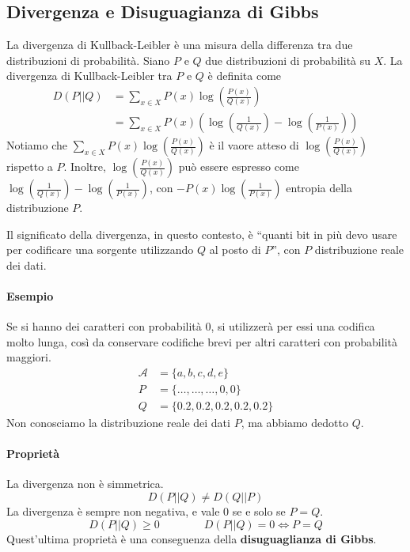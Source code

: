 \subsection{Divergenza e Disuguagianza di Gibbs}
La divergenza di Kullback-Leibler è una misura della differenza tra due distribuzioni di probabilità. Siano $P$ e $Q$ due distribuzioni di probabilità su $X$. La divergenza di Kullback-Leibler tra $P$ e $Q$ è definita come
\begin{align*}
    D(P||Q) &= \sum_{x\in X} P(x)\log\left(\frac{P(x)}{Q(x)}\right)\\
    &= \sum_{x\in X} P(x) \left( \log\left(\frac{1}{Q(x)}\right) - \log\left(\frac{1}{P(x)}\right) \right)
\end{align*}
Notiamo che $\sum_{x\in X} P(x)\log\left(\frac{P(x)}{Q(x)}\right)$ è il vaore atteso di $\log\left(\frac{P(x)}{Q(x)}\right)$ rispetto a $P$. Inoltre, $\log\left(\frac{P(x)}{Q(x)}\right)$ può essere espresso come $\log\left(\frac{1}{Q(x)}\right) - \log\left(\frac{1}{P(x)}\right)$, con $-P(x)\log\left(\frac{1}{P(x)}\right)$ entropia della distribuzione $P$.

Il significato della divergenza, in questo contesto, è ``quanti bit in più devo usare per codificare una sorgente utilizzando $Q$ al posto di $P$'', con $P$ distribuzione reale dei dati.

\paragraph{Esempio} Se si hanno dei caratteri con probabilità 0, si utilizzerà per essi una codifica molto lunga, così da conservare codifiche brevi per altri caratteri con probabilità maggiori.
\begin{align*}
    \mathcal{A} &= \{a,b,c,d,e\}\\
    P &= \{\dots,\dots,\dots,0,0\}\\
    Q &= \{0.2,0.2,0.2,0.2,0.2\}
\end{align*}
Non conosciamo la distribuzione reale dei dati $P$, ma abbiamo dedotto $Q$.

\paragraph{Proprietà} La divergenza non è simmetrica.
$$
    D(P||Q) \neq D(Q||P)
$$
La divergenza è sempre non negativa, e vale 0 se e solo se $P=Q$.
$$
    D(P||Q) \geq 0 \qquad\qquad D(P||Q) = 0 \Leftrightarrow P=Q
$$
Quest'ultima proprietà è una conseguenza della \textbf{disuguaglianza di Gibbs}.


